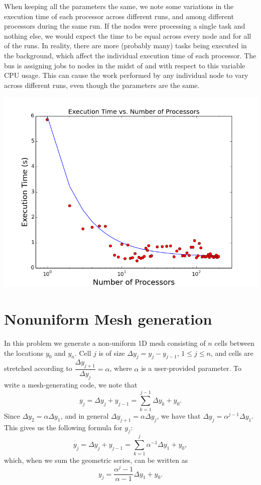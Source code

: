 \documentclass{article}
\begin{document}
When keeping all the parameters the same, we note some variations in the execution time of each processor across different
runs, and among different processors during the same run. If the nodes were processing a single task and nothing else,
we would expect the time to be equal across every node and for all of the runs. In reality, there are more
(probably many) tasks being executed in the background, which affect the individual execution time of each processor.
The bus is assigning jobs to nodes in the midst of and with respect to this variable CPU usage. This can cause the work
performed by any individual node to vary across different runs, even though the parameters are the same.

\includegraphics[width=1\textwidth]{t_vs_np.png}


\section{ Nonuniform Mesh generation}

In this problem we generate a non-uniform 1D mesh consisting of $n$ cells between the locations $y_0$ and $y_n$. Cell $j$ is of size $\Delta y_j = y_j-y_{j-1}$, $ 1\leq j \leq n$, and cells are stretched according to $\dfrac{\Delta y_{j+1}}{\Delta y_j}  =\alpha$, where $\alpha$ is a user-provided parameter. To write a mesh-generating code, we note that 
\[ y_j  = \Delta y_j + y_{j-1} = \sum_{k=1}^{j-1} \Delta y_k + y_0.\]
Since $\Delta y_2 = \alpha \Delta y_1$, and in general $\Delta y_{j+1} = \alpha  \Delta y_{j}$, we have that $\Delta y_{j} = \alpha^{j-1} \Delta y_1$. This gives us the following formula for $y_j$:
\[ y_j  = \Delta y_j + y_{j-1} = \sum_{k=1}^{j} \alpha^{-1} \Delta y_1 + y_0, \]
which, when we sum the geometric series, can be written as 
\begin{equation}
\label{eq:yj}
 y_j = \dfrac{\alpha^{j}-1}{\alpha -1} \Delta y_1 +y_0. 
\end{equation}
\end{document}
